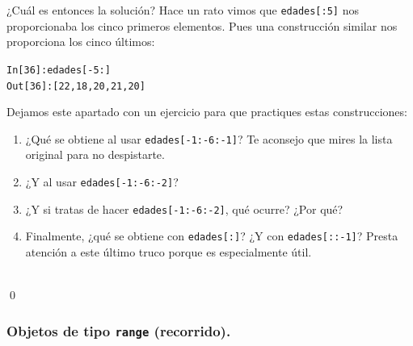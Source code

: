 \documentclass[10pt,a4paper]{article}\usepackage[]{graphicx}\usepackage[]{color}
\makeatletter
\newenvironment{kframe}{%
 \def\at@end@of@kframe{}%
 \ifinner\ifhmode%
  \def\at@end@of@kframe{\end{minipage}}%
  \begin{minipage}{\columnwidth}%
 \fi\fi%
 \def\FrameCommand##1{\hskip\@totalleftmargin \hskip-\fboxsep
 \colorbox{shadecolor}{##1}\hskip-\fboxsep
     \hskip-\linewidth \hskip-\@totalleftmargin \hskip\columnwidth}%
 \MakeFramed {\advance\hsize-\width
   \@totalleftmargin\z@ \linewidth\hsize
   \@setminipage}}%
 {\par\unskip\endMakeFramed%
 \at@end@of@kframe}
\newenvironment{knitrout}{}{} %
\makeatother
\begin{document}
¿Cuál es entonces la solución? Hace un rato vimos que {\tt edades[:5]} nos proporcionaba los cinco primeros elementos. Pues una construcción similar nos proporciona los cinco últimos:
\begin{knitrout}
\color{fgcolor}\begin{kframe}
\begin{alltt}
In [36]: edades[-5:]
Out[36]: [22, 18, 20, 21, 20]
\end{alltt}
\end{kframe}
\end{knitrout}

Dejamos este apartado con un ejercicio para que practiques estas construcciones:
\begin{ejercicio}
\label{tut02:ejercicio13}
\quad
\begin{enumerate}
\item ¿Qué se obtiene al usar {\tt edades[-1:-6:-1]}?  Te aconsejo que mires la lista original para no despistarte.
\item ¿Y al usar {\tt edades[-1:-6:-2]}?
\item ¿Y si tratas de hacer {\tt edades[-1:-6:-2]}, qué ocurre? ¿Por qué?
\item Finalmente, ¿qué se obtiene con {\tt edades[:]}? ¿Y con {\tt edades[::-1]}? Presta atención a este último truco porque es especialmente útil.
\end{enumerate}
\quad\\
\qed
\end{ejercicio}

\subsubsection*{Objetos de tipo {\tt range} (recorrido).}
\label{tut02:subsubsec:objetosTipoRange}
\end{document}
